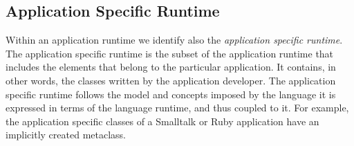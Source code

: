 \subsection{Application Specific Runtime}

Within an application runtime we identify also the \emph{application specific runtime}. The application specific runtime is the subset of the application runtime that includes the elements that belong to the particular application. It contains, in other words, the classes written by the application developer. The application specific runtime follows the model and concepts imposed by the language \ie it is expressed in terms of the language runtime, and thus coupled to it. For example, the application specific classes of a Smalltalk or Ruby application have an implicitly created metaclass.

%
%
%
%



